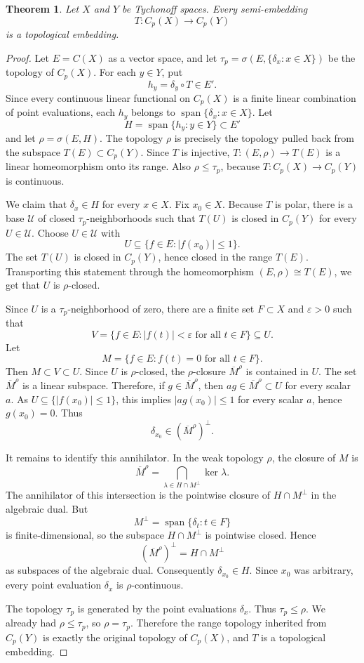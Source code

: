 \documentclass[11pt]{amsart}
\newtheorem{theorem}{Theorem}
\newcommand{\Cp}{C_p}
\newcommand{\spn}{\operatorname{span}}
\begin{document}
\begin{theorem}
Let \(X\) and \(Y\) be Tychonoff spaces.  Every semi-embedding
\[
  T:\Cp(X)\longrightarrow \Cp(Y)
\]
is a topological embedding.
\end{theorem}

\begin{proof}
Let \(E=C(X)\) as a vector space, and let
\(\tau_p=\sigma(E,\{\delta_x:x\in X\})\) be the topology of \(\Cp(X)\).
For each \(y\in Y\), put
\[
  h_y=\delta_y\circ T\in E'.
\]
Since every continuous linear functional on \(\Cp(X)\) is a finite linear
combination of point evaluations, each \(h_y\) belongs to
\(\spn\{\delta_x:x\in X\}\).  Let
\[
  H=\spn\{h_y:y\in Y\}\subset E'
\]
and let \(\rho=\sigma(E,H)\).  The topology \(\rho\) is precisely the topology
pulled back from the subspace \(T(E)\subset \Cp(Y)\).  Since \(T\) is
injective, \(T:(E,\rho)\to T(E)\) is a linear homeomorphism onto its range.
Also \(\rho\le \tau_p\), because \(T:\Cp(X)\to\Cp(Y)\) is continuous.

We claim that \(\delta_x\in H\) for every \(x\in X\).  Fix \(x_0\in X\).
Because \(T\) is polar, there is a base \(\mathcal U\) of closed
\(\tau_p\)-neighborhoods such that \(T(U)\) is closed in \(\Cp(Y)\) for every
\(U\in\mathcal U\).  Choose \(U\in\mathcal U\) with
\[
  U\subseteq \{f\in E: |f(x_0)|\le 1\}.
\]
The set \(T(U)\) is closed in \(\Cp(Y)\), hence closed in the range \(T(E)\).
Transporting this statement through the homeomorphism
\((E,\rho)\cong T(E)\), we get that \(U\) is \(\rho\)-closed.

Since \(U\) is a \(\tau_p\)-neighborhood of zero, there are a finite set
\(F\subset X\) and \(\varepsilon>0\) such that
\[
  V=\{f\in E: |f(t)|<\varepsilon\text{ for all }t\in F\}\subseteq U.
\]
Let
\[
  M=\{f\in E: f(t)=0\text{ for all }t\in F\}.
\]
Then \(M\subset V\subset U\).  Since \(U\) is \(\rho\)-closed, the
\(\rho\)-closure \(\overline M^\rho\) is contained in \(U\).  The set
\(\overline M^\rho\) is a linear subspace.  Therefore, if
\(g\in\overline M^\rho\), then \(ag\in\overline M^\rho\subset U\) for every
scalar \(a\).  As \(U\subseteq\{|f(x_0)|\le 1\}\), this implies
\(|a g(x_0)|\le 1\) for every scalar \(a\), hence \(g(x_0)=0\).  Thus
\[
  \delta_{x_0}\in(\overline M^\rho)^\perp .
\]

It remains to identify this annihilator.  In the weak topology \(\rho\), the
closure of \(M\) is
\[
  \overline M^\rho
  =\bigcap_{\lambda\in H\cap M^\perp}\ker \lambda .
\]
The annihilator of this intersection is the pointwise closure of
\(H\cap M^\perp\) in the algebraic dual.  But
\[
  M^\perp=\spn\{\delta_t:t\in F\}
\]
is finite-dimensional, so the subspace \(H\cap M^\perp\) is pointwise closed.
Hence
\[
  (\overline M^\rho)^\perp=H\cap M^\perp
\]
as subspaces of the algebraic dual.  Consequently \(\delta_{x_0}\in H\).
Since \(x_0\) was arbitrary, every point evaluation \(\delta_x\) is
\(\rho\)-continuous.

The topology \(\tau_p\) is generated by the point evaluations \(\delta_x\).
Thus \(\tau_p\le \rho\).  We already had \(\rho\le\tau_p\), so
\(\rho=\tau_p\).  Therefore the range topology inherited from \(\Cp(Y)\) is
exactly the original topology of \(\Cp(X)\), and \(T\) is a topological
embedding.
\end{proof}
\end{document}
